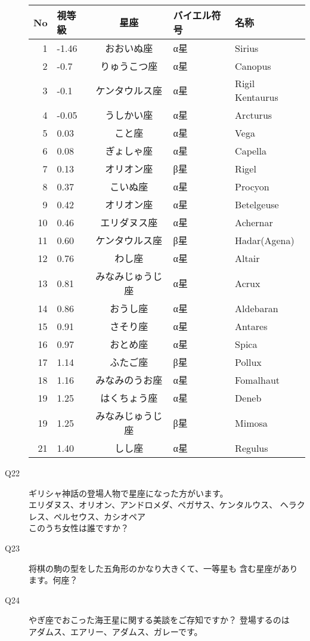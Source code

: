 \documentclass[fleqn]{article}
\renewcommand{\arraystretch}{2.4}
\begin{document}
\begin{description}
{{\renewcommand\arraystretch{1.0}
\begin{tabular}{|r|l|c|l|l|}
\hline
No&視等級&星座&バイエル符号&名称\\
\hline
1&-1.46&おおいぬ座&α星&Sirius\\
\hline
2&-0.7&りゅうこつ座&α星&Canopus\\
\hline
3&-0.1&ケンタウルス座&α星&Rigil Kentaurus\\
\hline
4&-0.05&うしかい座&α星&Arcturus\\
\hline
5&0.03&こと座&α星&Vega\\
\hline
6&0.08&ぎょしゃ座&α星&Capella\\
\hline
7&0.13&オリオン座&β星&Rigel\\
\hline
8&0.37&こいぬ座&α星&Procyon\\
\hline
9&0.42&オリオン座&α星&Betelgeuse\\
\hline
10&0.46&エリダヌス座&α星&Achernar\\
\hline
11&0.60&ケンタウルス座&β星&Hadar(Agena)\\
\hline
12&0.76&わし座&α星&Altair\\
\hline
13&0.81&みなみじゅうじ座&α星&Acrux\\
\hline
14&0.86&おうし座&α星&Aldebaran\\
\hline
15&0.91&さそり座&α星&Antares\\
\hline
16&0.97&おとめ座&α星&Spica\\
\hline
17&1.14&ふたご座&β星&Pollux\\
\hline
18&1.16&みなみのうお座&α星&Fomalhaut\\
\hline
19&1.25&はくちょう座&α星&Deneb\\
\hline
19&1.25&みなみじゅうじ座&β星&Mimosa\\
\hline
21&1.40&しし座&α星&Regulus\\
\hline
\end{tabular}
}}
\item[Q22] {ギリシャ神話の登場人物で星座になった方がいます。\\
エリダヌス、オリオン、アンドロメダ、ペガサス、ケンタルウス、
ヘラクレス、ペルセウス、カシオペア\\
このうち女性は誰ですか？

}
\item[Q23] {将棋の駒の型をした五角形のかなり大きくて、一等星も
含む星座があります。何座？
}
\item[Q24]{やぎ座でおこった海王星に関する美談をご存知ですか？
登場するのは　アダムス、エアリー、アダムス、ガレーです。
}


\end{description}
\end{document}
